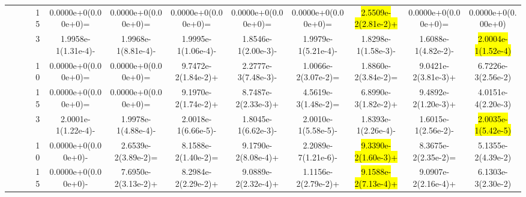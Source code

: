 \documentclass[a4paper,fleqn]{cas-dc}
\newcommand{\highlight}[1]{
	\begingroup
	\sethlcolor{Seashell}%
	\hl{#1}%
	\endgroup
}
\begin{document}
\begin{sloppypar}
\begin{table}[ht]
{\begin{tabular}{ccccccccccc}
					\multirow{9}{*}{~}&\multirow{3}{*}{~} &15 	&0.0000e+0(0.00e+0)=		&0.0000e+0(0.00e+0)=	&0.0000e+0(0.00e+0)=	&0.0000e+0(0.00e+0)=	&0.0000e+0(0.00e+0)=	&\highlight{2.5509e-2(2.81e-2)+}	&0.0000e+0(0.00e+0)=	&0.0000e+0(0.00e+0)\\
					
					
					
					
					
					
					
					
					\multirow{9}{*}{~}&\multirow{3}{*}{MaF6} &3 &1.9958e-1(1.31e-4)-	&1.9968e-1(8.81e-4)-	&1.9995e-1(1.06e-4)-	&1.8546e-1(2.00e-3)-	&1.9979e-1(5.21e-4)-	&1.8298e-1(1.58e-3)-	&1.6088e-1(4.82e-2)-	&\highlight{2.0004e-1(1.52e-4)}\\ 
					
					\multirow{9}{*}{~}&\multirow{3}{*}{~} &10 	&0.0000e+0(0.00e+0)=		&0.0000e+0(0.00e+0)=	&9.7472e-2(1.84e-2)+	&2.2777e-3(7.48e-3)-	&1.0066e-2(3.07e-2)=	&1.8860e-2(3.84e-2)=	&9.0421e-2(3.81e-3)+	&6.7226e-3(2.56e-2)\\
					
					\multirow{9}{*}{~}&\multirow{3}{*}{~} &15&0.0000e+0(0.00e+0)=		&0.0000e+0(0.00e+0)=	&9.1970e-2(1.74e-2)+	&8.7487e-2(2.33e-3)+	&4.5619e-3(1.48e-2)=	&6.8990e-3(1.82e-2)+	&9.4892e-2(1.20e-3)+	&4.0151e-4(2.20e-3)\\
					
					
					
					
					
					
					
					
					\multirow{9}{*}{~}&\multirow{3}{*}{DTLZ6} &3 &2.0001e-1(1.22e-4)-	&1.9978e-1(4.88e-4)-	&2.0018e-1(6.66e-5)-	&1.8045e-1(6.62e-3)-	&2.0010e-1(5.58e-5)-	&1.8393e-1(2.26e-4)-	&1.6015e-1(2.56e-2)-	&\highlight{2.0035e-1(5.42e-5)}\\ 
					
					\multirow{9}{*}{~}&\multirow{3}{*}{~} &10	&0.0000e+0(0.00e+0)-		&2.6539e-2(3.89e-2)=	&8.1588e-2(1.40e-2)=	&9.1790e-2(8.08e-4)+	&2.2089e-7(1.21e-6)-	&\highlight{9.3390e-2(1.60e-3)+}	&8.3675e-2(2.35e-2)=	&5.1355e-2(4.39e-2)\\
					
					\multirow{9}{*}{~}&\multirow{3}{*}{~} &15 	&0.0000e+0(0.00e+0)-		&7.6950e-2(3.13e-2)+	&8.2984e-2(2.29e-2)+	&9.0889e-2(2.32e-4)+	&1.1156e-2(2.79e-2)+	&\highlight{9.1588e-2(7.13e-4)+}	&9.0907e-2(2.16e-4)+	&6.1303e-3(2.30e-2)\\
					
					
					
					
					

\end{tabular}}
\end{table}
\end{sloppypar}
\end{document}
